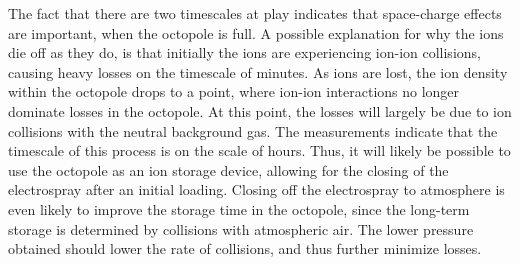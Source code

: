 The fact that there are two timescales at play indicates that space-charge effects are important, when the octopole is full. A possible explanation for why the ions die off as they do, is that initially the ions are experiencing ion-ion collisions, causing heavy losses on the timescale of minutes.
As ions are lost, the ion density within the octopole drops to a point, where ion-ion interactions no longer dominate losses in the octopole.
At this point, the losses will largely be due to ion collisions with the neutral background gas. The measurements indicate that the timescale of this process is on the scale of hours.
Thus, it will likely be possible to use the octopole as an ion storage device, allowing for the closing of the electrospray after an initial loading.
Closing off the electrospray to atmosphere is even likely to improve the storage time in the octopole, since the long-term storage is determined by collisions with atmospheric air. The lower pressure obtained should lower the rate of collisions, and thus further minimize losses.